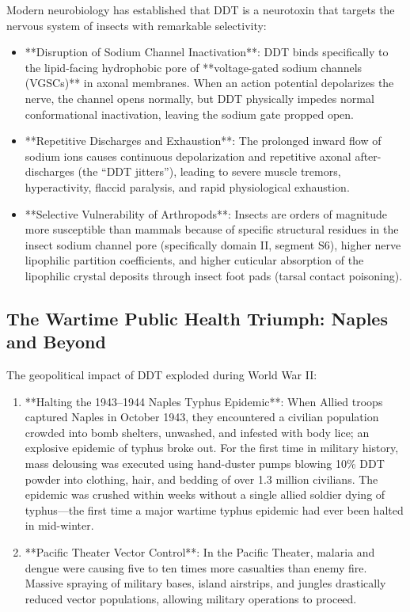 Modern neurobiology has established that DDT is a neurotoxin that targets the nervous system of insects with remarkable selectivity:
\begin{itemize}
    \item **Disruption of Sodium Channel Inactivation**: DDT binds specifically to the lipid-facing hydrophobic pore of **voltage-gated sodium channels (VGSCs)** in axonal membranes. When an action potential depolarizes the nerve, the channel opens normally, but DDT physically impedes normal conformational inactivation, leaving the sodium gate propped open.
    \item **Repetitive Discharges and Exhaustion**: The prolonged inward flow of sodium ions causes continuous depolarization and repetitive axonal after-discharges (the ``DDT jitters''), leading to severe muscle tremors, hyperactivity, flaccid paralysis, and rapid physiological exhaustion.
    \item **Selective Vulnerability of Arthropods**: Insects are orders of magnitude more susceptible than mammals because of specific structural residues in the insect sodium channel pore (specifically domain II, segment S6), higher nerve lipophilic partition coefficients, and higher cuticular absorption of the lipophilic crystal deposits through insect foot pads (tarsal contact poisoning).
\end{itemize}

\subsection{The Wartime Public Health Triumph: Naples and Beyond}

The geopolitical impact of DDT exploded during World War II:
\begin{enumerate}
    \item **Halting the 1943–1944 Naples Typhus Epidemic**: When Allied troops captured Naples in October 1943, they encountered a civilian population crowded into bomb shelters, unwashed, and infested with body lice; an explosive epidemic of typhus broke out. For the first time in military history, mass delousing was executed using hand-duster pumps blowing 10\% DDT powder into clothing, hair, and bedding of over 1.3 million civilians. The epidemic was crushed within weeks without a single allied soldier dying of typhus—the first time a major wartime typhus epidemic had ever been halted in mid-winter.
    \item **Pacific Theater Vector Control**: In the Pacific Theater, malaria and dengue were causing five to ten times more casualties than enemy fire. Massive spraying of military bases, island airstrips, and jungles drastically reduced vector populations, allowing military operations to proceed.
\end{enumerate}

